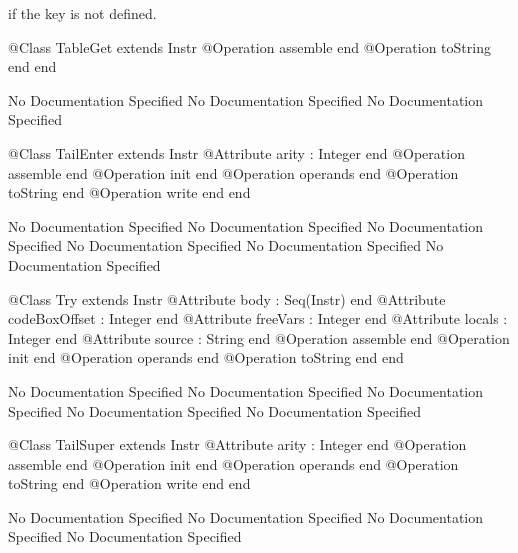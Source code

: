       if the key is not defined.
\begin{Interface}
@Class TableGet extends Instr
  @Operation assemble end
  @Operation toString end
end
\end{Interface}
No Documentation Specified
No Documentation Specified
No Documentation Specified
\begin{Interface}
@Class TailEnter extends Instr
  @Attribute arity : Integer end
  @Operation assemble end
  @Operation init end
  @Operation operands end
  @Operation toString end
  @Operation write end
end
\end{Interface}
No Documentation Specified
No Documentation Specified
No Documentation Specified
No Documentation Specified
No Documentation Specified
No Documentation Specified
\begin{Interface}
@Class Try extends Instr
  @Attribute body : Seq(Instr) end
  @Attribute codeBoxOffset : Integer end
  @Attribute freeVars : Integer end
  @Attribute locals : Integer end
  @Attribute source : String end
  @Operation assemble end
  @Operation init end
  @Operation operands end
  @Operation toString end
end
\end{Interface}
No Documentation Specified
No Documentation Specified
No Documentation Specified
No Documentation Specified
No Documentation Specified
\begin{Interface}
@Class TailSuper extends Instr
  @Attribute arity : Integer end
  @Operation assemble end
  @Operation init end
  @Operation operands end
  @Operation toString end
  @Operation write end
end
\end{Interface}
No Documentation Specified
No Documentation Specified
No Documentation Specified
No Documentation Specified
